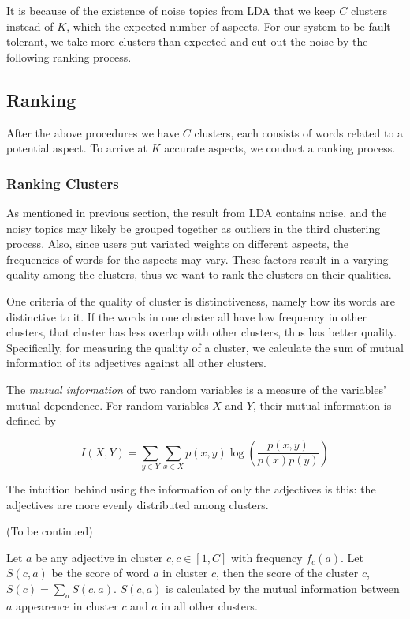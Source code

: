 It is because of the existence of noise topics from LDA that we keep $C$ clusters instead of $K$, which the expected number of aspects. For our system to be fault-tolerant, we take more clusters than expected and cut out the noise by the following ranking process.

\subsection{Ranking}
After the above procedures we have $C$ clusters, each consists of words related to a potential aspect. To arrive at $K$ accurate aspects, we conduct a ranking process.

\subsubsection{Ranking Clusters}
As mentioned in previous section, the result from LDA contains noise, and the noisy topics may likely be grouped together as outliers in the third clustering process. Also, since users put variated weights on different aspects, the frequencies of words for the aspects may vary. These factors result in a varying quality among the clusters, thus we want to rank the clusters on their qualities.

One criteria of the quality of cluster is distinctiveness, namely how its words are distinctive to it. If the words in one cluster all have low frequency in other clusters, that cluster has less overlap with other clusters, thus has better quality. Specifically, for measuring the quality of a cluster, we calculate the sum of mutual information of its adjectives against all other clusters.

The \emph{mutual information} of two random variables is a measure of the variables' mutual dependence. For random variables $X$ and $Y$, their mutual information is defined by 

$$I(X, Y) = \sum_{y\in Y} \sum_{x\in X} p(x, y) \log\left(\frac{p(x, y)}{p(x)p(y)}\right)$$

The intuition behind using the information of only the adjectives is this: the adjectives are more evenly distributed among clusters.

(To be continued)

Let $a$ be any adjective in cluster $c, c\in[1,C]$ with frequency $f_c(a)$. Let $S(c, a)$ be the score of word $a$ in cluster $c$, then the score of the cluster $c$, $S(c) = \sum_{a} S(c,a)$. $S(c,a)$ is calculated by the mutual information between $a$ appearence in cluster $c$ and $a$ in all other clusters.


